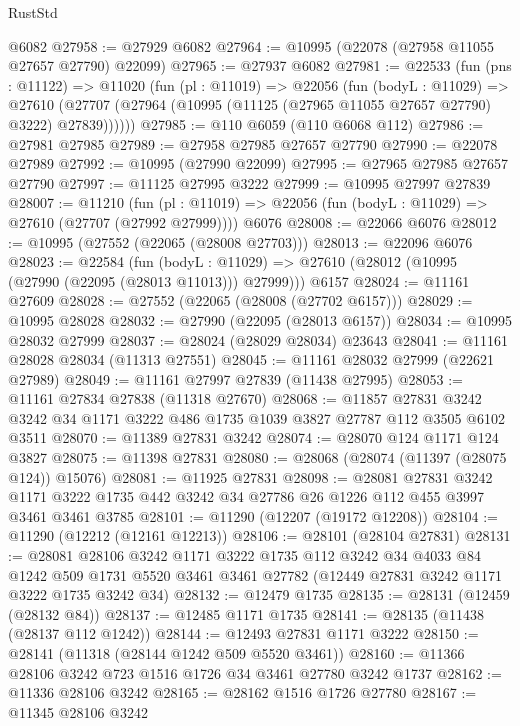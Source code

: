 \begin{lexlean}{RustStd}
\begin{coremodule}
    @6082
@27958 := @27929 @6082
@27964 := @10995 (@22078 (@27958 @11055 @27657 @27790) @22099)
@27965 := @27937 @6082
@27981 := @22533
    (fun (pns : @11122) =>
    @11020
      (fun (pl : @11019) =>
      @22056
        (fun (bodyL : @11029) =>
        @27610 (@27707 (@27964 (@10995 (@11125 (@27965 @11055 @27657 @27790) @3222) @27839))))))
@27985 := @110 @6059 (@110 @6068 @112)
@27986 := @27981 @27985
@27989 := @27958 @27985 @27657 @27790
@27990 := @22078 @27989
@27992 := @10995 (@27990 @22099)
@27995 := @27965 @27985 @27657 @27790
@27997 := @11125 @27995 @3222
@27999 := @10995 @27997 @27839
@28007 := @11210
    (fun (pl : @11019) => @22056 (fun (bodyL : @11029) => @27610 (@27707 (@27992 @27999))))
    @6076
@28008 := @22066 @6076
@28012 := @10995 (@27552 (@22065 (@28008 @27703)))
@28013 := @22096 @6076
@28023 := @22584
    (fun (bodyL : @11029) => @27610 (@28012 (@10995 (@27990 (@22095 (@28013 @11013))) @27999)))
    @6157
@28024 := @11161 @27609
@28028 := @27552 (@22065 (@28008 (@27702 @6157)))
@28029 := @10995 @28028
@28032 := @27990 (@22095 (@28013 @6157))
@28034 := @10995 @28032 @27999
@28037 := @28024 (@28029 @28034) @23643
@28041 := @11161 @28028 @28034 (@11313 @27551)
@28045 := @11161 @28032 @27999 (@22621 @27989)
@28049 := @11161 @27997 @27839 (@11438 @27995)
@28053 := @11161 @27834 @27838 (@11318 @27670)
@28068 := @11857
    @27831
    @3242
    @3242
    @34
    @1171
    @3222
    @486
    @1735
    @1039
    @3827
    @27787
    @112
    @3505
    @6102
    @3511
@28070 := @11389 @27831 @3242
@28074 := @28070 @124 @1171 @124 @3827
@28075 := @11398 @27831
@28080 := @28068 (@28074 (@11397 (@28075 @124)) @15076)
@28081 := @11925 @27831
@28098 := @28081
    @27831
    @3242
    @1171
    @3222
    @1735
    @442
    @3242
    @34
    @27786
    @26
    @1226
    @112
    @455
    @3997
    @3461
    @3461
    @3785
@28101 := @11290 (@12207 (@19172 @12208))
@28104 := @11290 (@12212 (@12161 @12213))
@28106 := @28101 (@28104 @27831)
@28131 := @28081
    @28106
    @3242
    @1171
    @3222
    @1735
    @112
    @3242
    @34
    @4033
    @84
    @1242
    @509
    @1731
    @5520
    @3461
    @3461
    @27782
    (@12449 @27831 @3242 @1171 @3222 @1735 @3242 @34)
@28132 := @12479 @1735
@28135 := @28131 (@12459 (@28132 @84))
@28137 := @12485 @1171 @1735
@28141 := @28135 (@11438 (@28137 @112 @1242))
@28144 := @12493 @27831 @1171 @3222
@28150 := @28141 (@11318 (@28144 @1242 @509 @5520 @3461))
@28160 := @11366 @28106 @3242 @723 @1516 @1726 @34 @3461 @27780 @3242 @1737
@28162 := @11336 @28106 @3242
@28165 := @28162 @1516 @1726 @27780
@28167 := @11345 @28106 @3242

\end{coremodule}
\end{lexlean}
